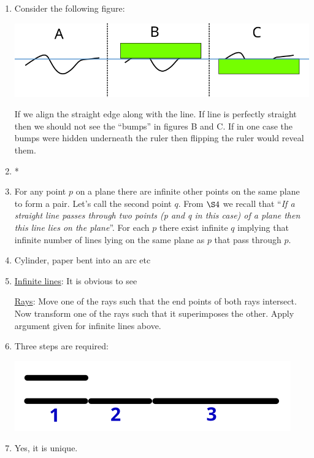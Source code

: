 \begin{enumerate}
	\item Consider the following figure:
	
	\includegraphics[scale=0.75]{chapters/ch00/images/07}
	
	If we align the straight edge along with the line. If line is perfectly straight then we should not see the ``bumps'' in figures B and C. If in one case the bumps were hidden underneath the ruler then flipping the ruler would reveal them.
	
	\item *
	
	\item For any point $p$ on a plane there are infinite other points on the same plane to form a pair. Let's call the second point $q$. From $\S4$ we recall that ``\textit{If a straight line passes through two points (p and q in this case) of a plane then this line lies on the plane}''. For each $p$ there exist infinite $q$ implying that infinite number of lines lying on the same plane as $p$ that pass through $p$.
	
	\item Cylinder, paper bent into an arc etc
	
	\item \underline{Infinite lines}: It is obvious to see
	
	\underline{Rays}: Move one of the rays such that the end points of both rays intersect. Now transform one of the rays such that it superimposes the other. Apply argument given for infinite lines above.
	
	\item Three steps are required:
	
	\includegraphics[scale=1.3]{chapters/ch00/images/12}
	
	\vskip 5cm
	\item Yes, it is unique. 
	

\end{enumerate}
